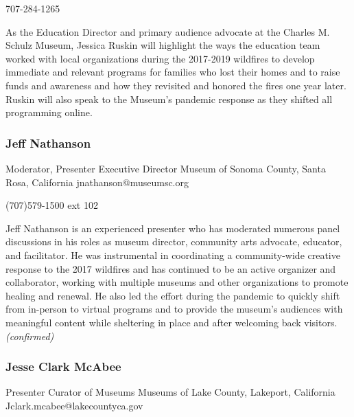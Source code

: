 \documentclass{report}
\begin{document}
              707-284-1265\newline

              As the Education Director and primary audience advocate at the Charles M. Schulz Museum, Jessica Ruskin will highlight the ways the education team worked with local organizations during the 2017-2019 wildfires to develop immediate and relevant programs for families who lost their homes and to raise funds and awareness and how they revisited and honored the fires one year later. Ruskin will also speak to the Museum's pandemic response as they shifted all programming online.\newline


              
                \subsubsection*{ Jeff Nathanson }
                Moderator, Presenter\newline
                Executive Director\newline
                Museum of Sonoma County, Santa Rosa, California
                \newline
                jnathanson@museumsc.org\newline
                
                (707)579-1500 ext 102 \newline

                Jeff Nathanson is an experienced presenter who has moderated numerous panel discussions in his roles as museum director, community arts advocate, educator, and facilitator. He was instrumental in coordinating a community-wide creative response to the 2017 wildfires and has continued to be an active organizer and collaborator, working with multiple museums and other organizations to promote healing and renewal. He also led the effort during the pandemic to quickly shift from in-person to virtual programs and to provide the museum’s audiences with meaningful content while sheltering in place and after welcoming back visitors.\newline
                \emph{ (confirmed) }
              

              
                \subsubsection*{ Jesse  Clark McAbee }
                Presenter\newline
                Curator of Museums\newline
                Museums of Lake County, Lakeport, California
                \newline
                Jclark.mcabee@lakecountyca.gov\newline
                
\end{document}
